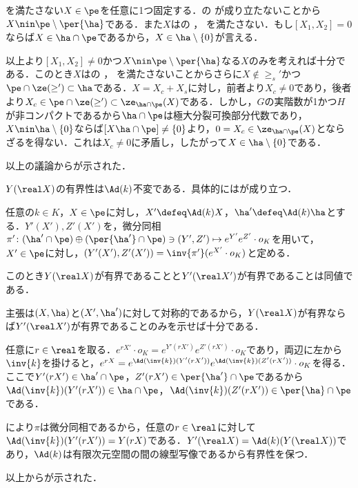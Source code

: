 \begin{npfwn}
\begin{enumerate}[label=\textbf{\arabic*.}]
    
    
    を満たさない$X\in \pe$を任意に1つ固定する．の  が成り立たないことから$X\nin \pe\setminus\per{\ha}$である．また$X$はの ， を満たさない．もし$[X_1, X_2] = 0 $ ならば$X\in\ha\cap \pe $であるから，$X\in \ha\setminus\{0\} $が言える．

    以上より$[X_1,X_2] \neq 0$かつ$X\nin \pe\setminus\per{\ha}$なる$X$のみを考えれば十分である．このとき$X$はの ， を満たさないことからさらに$X\nin \ge_{s}' $かつ$\pe\cap\ze(\ge')\subset \ha $である．$X  = X_c + X_s $に対し，前者より$X_c\neq 0 $であり，後者より$X_c\in \pe\cap\ze(\ge')\subset \ze_{\ha\cap\pe}(X) $である．しかし，$G$の実階数が1かつ$H$が非コンパクトであるから$\ha\cap\pe$は極大分裂可換部分代数であり，$X\nin\ha\setminus\{0\} $ならば$[X \ha\cap\pe ] \neq  \{0\}$より，$0 = X_c \in \ze_{\ha\cap\pe}(X) $とならざるを得ない．これは$X_c\neq 0 $に矛盾し，したがって$X \in \ha\setminus\{0\}  $である．
    
    以上の議論からが示された．
  \end{enumerate}  
\end{npfwn}

$Y(\real X) $の有界性は$\Ad(k) $不変である．具体的にはが成り立つ．
\begin{lem}\label{lem:1101}
  任意の$k\in K$，$X\in \pe$に対し，$X'\defeq \Ad(k)X $，$\ha'\defeq \Ad(k)\ha $とする．$Y'(X'), Z'(X') $を，微分同相$\pi'\colon (\ha'\cap \pe)\oplus (\per{\ha'}\cap \pe)\ni (Y',Z')\mapsto e^{Y'}e^{Z'}\cdot o_K  $を用いて，$X'\in \pe$に対し，$(Y'(X'), Z'(X')) = \inv{\pi'}(e^{X'}\cdot o_K) $と定める．

  このとき$Y(\real X)$が有界であることと$ Y'(\real X') $が有界であることは同値である．
\end{lem}

\begin{npfwn}
  主張は$(X,\ha) $と$(X',\ha')$に対して対称的であるから，$Y(\real X) $が有界ならば$Y'(\real X') $が有界であることのみを示せば十分である．

  任意に$r\in \real$を取る．$e^{rX'}\cdot o_K = e^{Y'(r X')}e^{Z'(r X')}\cdot o_K  $であり，両辺に左から$\inv{k} $を掛けると，$e^{r X} = e^{\Ad(\inv{k})( Y'(r X'))}e^{\Ad(\inv{k})( Z'(r X'))}\cdot o_K  $を得る．ここで$Y'(rX')\in \ha'\cap \pe $，$Z'(r X')\in \per{\ha'}\cap \pe $であるから$\Ad(\inv{k})(Y'(r X'))\in \ha\cap \pe $，$\Ad(\inv{k})(Z'(r X')) \in \per{\ha}\cap \pe $である．

  により$\pi$は微分同相であるから，任意の$r\in \real$に対して$\Ad(\inv{k})(Y'(r X')) = Y(rX)  $である．$Y'(\real X) = \Ad(k)(Y(\real X))  $であり，$\Ad(k) $は有限次元空間の間の線型写像であるから有界性を保つ．

  以上からが示された．  
\end{npfwn}


